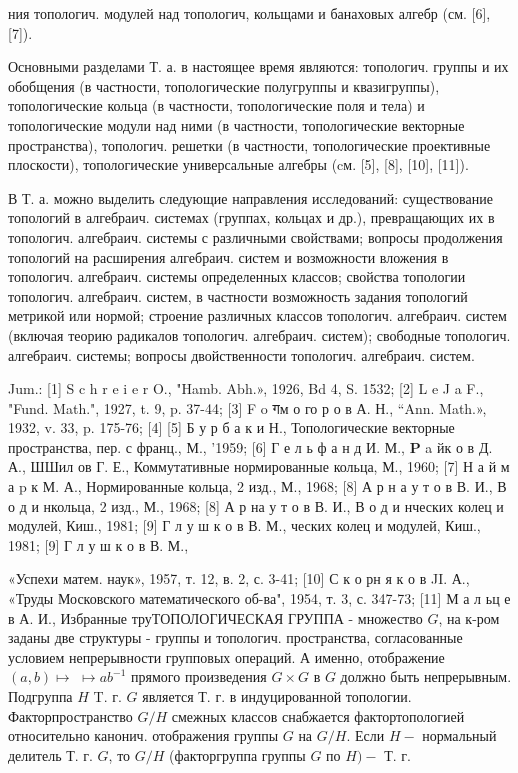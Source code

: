 \documentclass[10pt]{article}
\begin{document}
ния топологич. модулей над топологич, кольщами и банаховых алгебр (см. [6], [7]).



Основными разделами Т. а. в настоящее время являются: топологич. группы и их обобщения (в частности, топологические полугруппы и квазигруппы), топологические кольца (в частности, топологические поля и тела) и топологические модули над ними (в частности, топологические векторные пространства), топологич. решетки (в частности, топологические проективные плоскости), топологические универсальные алгебры (cм. [5], [8], [10], [11]).



В Т. а. можно выделить следующие направления исследований: существование топологий в алгебраич. системах (группах, кольцах и др.), превращающих их в топологич. алгебраич. системы с различными свойствами; вопросы продолжения топологий на расширения алгебраич. систем и возможности вложения в топологич. алгебраич. системы определенных классов; свойства топологии топологич. алгебраич. систем, в частности возможность задания топологий метрикой или нормой; строение различных классов топологич. алгебраич. систем (включая теорию радикалов топологич. алгебраич. систем); свободные топологич. алгебраич. системы; вопросы двойственности топологич. алгебраич. систем.



Jum.: [1] S c h r e i e r O., "Hamb. Abh.», 1926, Bd 4, S. 1532; [2] L e J a F., "Fund. Math.", 1927, t. 9, p. 37-44; [3] F o गм о го р о в А. Н., “Ann. Math.», 1932, v. 33, p. 175-76; [4] [5] Б у р б а к и Н., Топологические векторные пространства, пер. с франц., М., '1959; [6] Г е л ь ф а н д И. М., $\mathbf{P}$ a йк о в Д. А., ШШил ов Г. Е., Коммутативные нормированные кольца, М., 1960; [7] Н а й м а p к М. А., Нормированные кольца, 2 изд., М., 1968; [8] А р н а у т о в В. И., В о д и нкольца, 2 изд., М., 1968; [8] А р на у т о в В. И., В о д и нческих колец и модулей, Киш., 1981; [9] Г л у ш к о в В. М., ческих колец и модулей, Киш., 1981; [9] Г л у ш к о в В. М.,

«Успехи матем. наук», 1957, т. 12, в. 2, с. 3-41; [10] С к о рн я к о в JI. А., «Труды Московского математического об-ва", 1954, т. 3, с. 347-73; [11] М а л ьц е в А. И., Избранные труТОПОЛОГИЧЕСКАЯ ГРУППА - множество $G$, на к-ром заданы две структуры - группы и топологич. пространства, согласованные условием непрерывности групповых операций. А именно, отображение $(a, b) \mapsto$ $\mapsto a b^{-1}$ прямого произведения $G \times G$ в $G$ должно быть непрерывным. Подгруппа $H$ T. г. $G$ является Т. г. в индуцированной топологии. Факторпространство $G / H$ смежных классов снабжается фактортопологией относительно канонич. отображения группы $G$ на $G / H$. Если $H-$ нормальный делитель Т. г. $G$, то $G / H$ (факторгруппа группы $G$ по $H)-$ Т. г.
\end{document}
